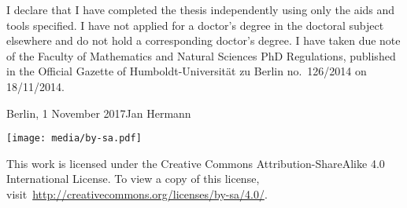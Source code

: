 \noindent I declare that I have completed the thesis independently using only the aids and tools specified.
I have not applied for a doctor's degree in the doctoral subject elsewhere and do not hold a corresponding doctor's degree.
I have taken due note of the Faculty of Mathematics and Natural Sciences PhD Regulations, published in the Official Gazette of Humboldt-Universität zu Berlin no.\ 126/2014 on 18/11/2014.
\vspace{1cm}

\noindent Berlin, 1 November 2017\hfill Jan Hermann
\vspace*{\fill}
\begin{center}
\small
\texttt{[image: media/by-sa.pdf]}
\vspace{.5em}

\noindent This work is licensed under the Creative Commons Attribution-ShareAlike 4.0 International License.
To view a copy of this license, visit~\url{http://creativecommons.org/licenses/by-sa/4.0/}.
\end{center}




\tableofcontents



\cleardoublepage%










\begingroup
\setlength\bibsep{0pt}
\renewcommand\bibname{References}
\raggedright%
\footnotesize

\endgroup

%
% 


